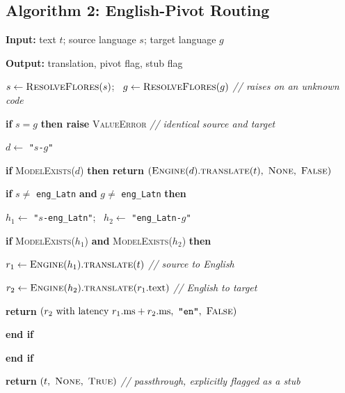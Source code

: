 \subsection{Algorithm 2: English-Pivot Routing}
\label{subsec:alg2}

\noindent \textbf{Input:} text $t$; source language $s$; target language $g$\par\nopagebreak
\noindent \textbf{Output:} translation, pivot flag, stub flag\par\nopagebreak
\vspace{2pt}
\begin{algsteps}
\item $s \leftarrow \textsc{ResolveFlores}(s)$; \ $g \leftarrow \textsc{ResolveFlores}(g)$ \quad \textit{// raises on an unknown code}
\item \textbf{if} $s = g$ \textbf{then raise} \textsc{ValueError} \quad \textit{// identical source and target}
\item $d \leftarrow$ \texttt{"}$s$\texttt{-}$g$\texttt{"}
\item \textbf{if} \textsc{ModelExists}($d$) \textbf{then return} $(\textsc{Engine}(d).\textsc{translate}(t),\ \textsc{None},\ \textsc{False})$
\item \textbf{if} $s \neq$ \texttt{eng\_Latn} \textbf{and} $g \neq$ \texttt{eng\_Latn} \textbf{then}
\item \algind $h_1 \leftarrow$ \texttt{"}$s$\texttt{-eng\_Latn"}; \ $h_2 \leftarrow$ \texttt{"eng\_Latn-}$g$\texttt{"}
\item \algind \textbf{if} \textsc{ModelExists}($h_1$) \textbf{and} \textsc{ModelExists}($h_2$) \textbf{then}
\item \algind \algind $r_1 \leftarrow \textsc{Engine}(h_1).\textsc{translate}(t)$ \quad \textit{// source to English}
\item \algind \algind $r_2 \leftarrow \textsc{Engine}(h_2).\textsc{translate}(r_1.\text{text})$ \quad \textit{// English to target}
\item \algind \algind \textbf{return} $(r_2 \text{ with latency } r_1.\text{ms} + r_2.\text{ms},\ \texttt{"en"},\ \textsc{False})$
\item \algind \textbf{end if}
\item \textbf{end if}
\item \textbf{return} $(t,\ \textsc{None},\ \textsc{True})$ \quad \textit{// passthrough, explicitly flagged as a stub}
\end{algsteps}

